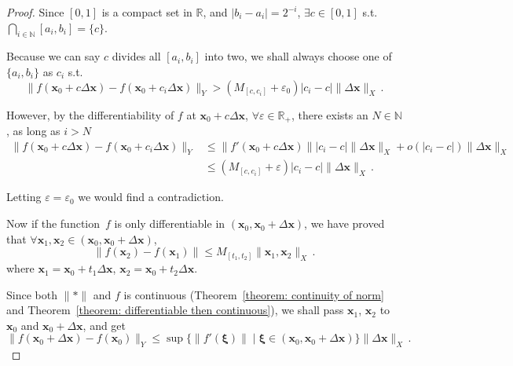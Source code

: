 \documentclass[openany]{book}
\theoremstyle{plain}
\theoremstyle{definition}
\newcommand*{\bv}{\boldsymbol} %
\begin{document}
\begin{proof}
	Since $[0, 1]$ is a compact set in $\mathbb R$, and $|b_i - a_i| = 2^{-i}$, $\exists c \in [0, 1]$ s.t.\ $\bigcap_{i \in \mathbb N} [a_i, b_i] = \{c\}$.

	Because we can say $c$ divides all $[a_i, b_i]$ into two, we shall always choose one of $\{a_i, b_i\}$ as $c_i$ s.t.\ 
	\begin{equation}\label{equation: inequality that violates differentiable}
		\|f(\bv x_0 + c \Delta \bv x) - f(\bv x_0 + c_i \Delta \bv x)\|_Y
			> (M_{[c, c_i]} + \varepsilon_0) |c_i - c| \|\Delta \bv x\|_X\,.
	\end{equation}

	However, by the differentiability of $f$ at $\bv x_0 + c \Delta \bv x$, $\forall \varepsilon \in \mathbb R_+$, there exists an $N \in \mathbb N$, as long as $i > N$
	\begin{align*}
		\|f(\bv x_0 + c \Delta \bv x) - f(\bv x_0 + c_i \Delta \bv x)\|_Y 
			&\leq \|f'(\bv x_0 + c\Delta \bv x)\||c_i - c|\|\Delta \bv x\|_X
				+ o(|c_i - c|) \|\Delta \bv x\|_X
		\\
			&\leq (M_{[c, c_i]} + \varepsilon) |c_i - c|\|\Delta \bv x\|_X\,.
	\end{align*}

	Letting $\varepsilon = \varepsilon_0$ we would find a contradiction.

	Now if the function~$f$ is only differentiable in $(\bv x_0, \bv x_0 + \Delta \bv x)$, we have proved that $\forall \bv x_1, \bv x_2 \in (\bv x_0, \bv x_0 + \Delta \bv x)$, 
	\begin{equation*}
		\|f(\bv x_2) - f(\bv x_1)\| \leq M_{[t_1, t_2]} \|\bv x_1, \bv x_2\|_X\,.
	\end{equation*}
	where $\bv x_1 = \bv x_0 + t_1 \Delta \bv x$, $\bv x_2 = \bv x_0 + t_2 \Delta \bv x$.

	Since both $\|*\|$ and $f$ is continuous (Theorem~\ref{theorem: continuity of norm} and Theorem~\ref{theorem: differentiable then continuous}), we shall pass $\bv x_1$, $\bv x_2$ to $\bv x_0$ and $\bv x_0 + \Delta \bv x$, and get
	\begin{equation*}
		\|f(\bv x_0 + \Delta \bv x) - f(\bv x_0)\|_Y 
			\leq \sup \{\|f'(\bv \xi)\|  \mid \bv \xi \in (\bv x_0, \bv x_0 + \Delta \bv x)\} \|\Delta \bv x\|_X\,.
	\end{equation*}
\end{proof}
\end{document}
